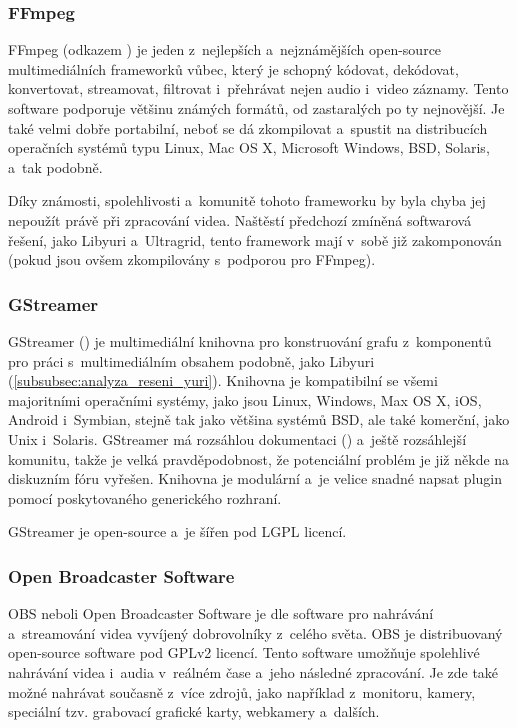 \documentclass[thesis=M,czech]{FITthesis}[2012/06/26]
\begin{document}
\subsubsection{FFmpeg} \label{subsubsec:analyza_reseni_ffmpeg}
FFmpeg (odkazem \cite{ffmpeg}) je jeden z~nejlepších a~nejznámějších open-source multimediálních frameworků vůbec, který je schopný kódovat, dekódovat, konvertovat, streamovat, filtrovat i~přehrávat nejen audio i~video záznamy. Tento software podporuje většinu známých formátů, od zastaralých po ty nejnovější. Je také velmi dobře portabilní, neboť se dá zkompilovat a~spustit na distribucích operačních systémů typu Linux, Mac OS X, Microsoft Windows, BSD, Solaris, a~tak podobně.

	Díky známosti, spolehlivosti a~komunitě tohoto frameworku by byla chyba jej nepoužít právě při zpracování videa. Naštěstí předchozí zmíněná softwarová řešení, jako Libyuri a~Ultragrid, tento framework mají v~sobě již zakomponován (pokud jsou ovšem zkompilovány s~podporou pro FFmpeg).

\subsubsection{GStreamer} \label{subsubsec:analyza_reseni_gstreamer}
GStreamer (\cite{gstreamer}) je multimediální knihovna pro konstruování grafu z~komponentů pro práci s~multimediálním obsahem podobně, jako Libyuri (\ref{subsubsec:analyza_reseni_yuri}). Knihovna je kompatibilní se všemi majoritními operačními systémy, jako jsou Linux, Windows, Max OS X, iOS, Android i~Symbian, stejně tak jako většina systémů BSD, ale také komerční, jako Unix i~Solaris. GStreamer má rozsáhlou dokumentaci (\cite{gstreamer_doc}) a~ještě rozsáhlejší komunitu, takže je velká pravděpodobnost, že potenciální problém je již někde na diskuzním fóru vyřešen. Knihovna je modulární a~je velice snadné napsat plugin pomocí poskytovaného generického rozhraní.

	GStreamer je open-source a~je šířen pod LGPL licencí.

\subsubsection{Open Broadcaster Software} \label{subsubsec:analyza_reseni_obs}
OBS neboli Open Broadcaster Software je dle \cite{obs} software pro nahrávání a~streamování videa vyvíjený dobrovolníky z~celého světa. OBS je distribuovaný open-source software pod GPLv2 licencí. Tento software umožňuje spolehlivé nahrávání videa i~audia v~reálném čase a~jeho následné zpracování. Je zde také možné nahrávat současně z~více zdrojů, jako například z~monitoru, kamery, speciální tzv. grabovací grafické karty, webkamery a~dalších.
\end{document}
